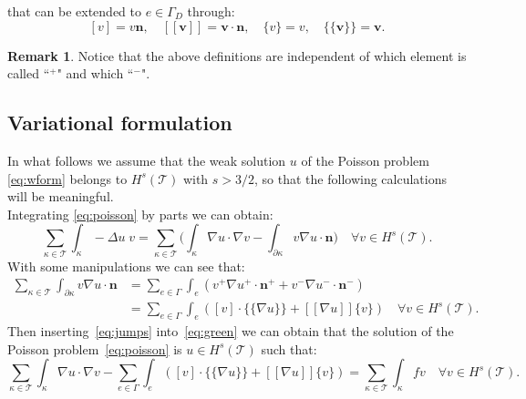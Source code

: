 \documentclass[12pt, a4paper]{article}
\theoremstyle{definition}
\theoremstyle{plain}
\theoremstyle{plain}
\theoremstyle{definition}
\newtheorem*{remark}{Remark}
\begin{document}
that can be extended to $e \in \Gamma_D$ through:
\begin{equation} \label{eq:jupsandaverdir}
	[v] = v \mathbf{n},
	\quad [\![ \mathbf{v} ]\!] = \mathbf{v} \cdot \mathbf{n},
	\quad \{v\} = v,
	\quad \{\!\!\{ \mathbf{v} \}\!\!\} = \mathbf{v}.
\end{equation}
\begin{remark}
	Notice that the above definitions are independent of which element is 
	called ``$^+$" and which ``$^-$".
\end{remark}
\subsection{Variational formulation}
In what follows we assume that the weak solution $u$ of the Poisson problem~ \eqref{eq:wform} belongs to $H^s(\mathcal{T})$ with $s > 3/2$, so that the following calculations will be meaningful.\\
Integrating \eqref{eq:poisson} by parts we can obtain:
\begin{equation} \label{eq:green}
	\sum_{\kappa \in \mathcal{T}} \int_\kappa -\Delta u \; v
	= \sum_{\kappa \in \mathcal{T}} \bigg( \int_\kappa \nabla u \cdot \nabla v
	- \int_{\partial \kappa} v \nabla u \cdot \mathbf{n} \bigg) \quad \forall v 
	\in H^s(\mathcal{T}).
\end{equation}
With some manipulations we can see that:
\begin{equation} \label{eq:jumps}
\begin{split}
	\sum_{\kappa \in \mathcal{T}} \int_{\partial \kappa} v \nabla u \cdot \mathbf{n} &= \sum_{e \in \Gamma} \int_e (v^+ \nabla u^+ \cdot \mathbf{n}^+ + v^- \nabla u^- \cdot \mathbf{n}^- )\\
	&= \sum_{e \in \Gamma} \int_e ([v] \cdot \{\!\!\{ \nabla u \}\!\!\} + [\![ 
	\nabla u ]\!] \{v\} ) \quad \forall v \in H^s(\mathcal{T}).
\end{split}
\end{equation}
Then inserting~\eqref{eq:jumps} into~\eqref{eq:green} we can obtain that the solution of the Poisson problem~\eqref{eq:poisson} is $u \in H^s(\mathcal{T})$ such that:
\begin{equation} \label{eq:firstform}
	\sum_{\kappa \in \mathcal{T}} \int_\kappa \nabla u \cdot \nabla v -
	\sum_{e \in \Gamma} \int_e ([v] \cdot \{\!\!\{ \nabla u \}\!\!\} + [\![ \nabla u ]\!] \{v\} ) =
	\sum_{\kappa \in \mathcal{T}} \int_\kappa fv \quad \forall v \in 
	H^s(\mathcal{T}).
\end{equation}
\end{document}
